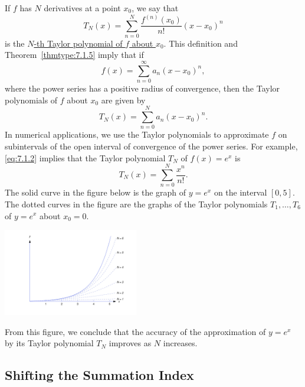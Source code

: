 \documentclass{ximera}
\begin{document}
If $f$ has $N$ derivatives at a point $x_0$, we say that
$$
T_N(x)=\sum_{n=0}^N\frac{f^{(n)}(x_0)}{n!}(x-x_0)^n
$$
is the
\href{http://www-history.mcs.st-and.ac.uk/Mathematicians/Taylor.html}{$N$-th Taylor polynomial of $f$ about $x_0$}.
This definition and Theorem~\ref{thmtype:7.1.5} imply  that if
$$
f(x)=\sum_{n=0}^\infty a_n(x-x_0)^n,
$$
where the power series has a positive radius of convergence,
then the Taylor polynomials of $f$ about $x_0$ are given by
$$
T_N(x)=\sum_{n=0}^N a_n(x-x_0)^n.
$$
In numerical applications, we use the Taylor polynomials to
approximate $f$ on subintervals of the open interval of convergence of
the power series. For example,  \eqref{eq:7.1.2} implies that the Taylor
polynomial $T_N$ of $f(x)=e^x$ is
$$
T_N(x)=\sum_{n=0}^N\frac{x^n}{n!}.
$$
The solid curve in the figure below is the graph
of $y=e^x$ on the interval $[0,5]$. The  dotted curves
in the figure are the graphs of the Taylor polynomials
$T_1, \dots, T_6$ of $y=e^x$ about $x_0=0$. 

\begin{image}
 \includegraphics[height=1.5in]{fig070101.jpg} 
\end{image}

From this figure, we conclude
that the accuracy of the
approximation of $y=e^x$ by its Taylor polynomial $T_N$ improves as
$N$ increases.

\subsection*{Shifting the Summation Index}
\end{document}
